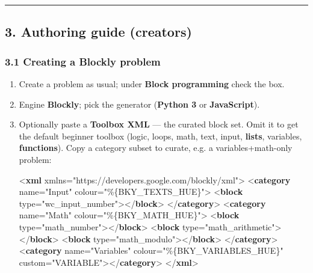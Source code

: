 \documentclass[
]{article}
\newenvironment{Shaded}{}{}
\newcommand{\KeywordTok}[1]{\textcolor[rgb]{0.00,0.44,0.13}{\textbf{#1}}}
\newcommand{\NormalTok}[1]{#1}
\newcommand{\OtherTok}[1]{\textcolor[rgb]{0.00,0.44,0.13}{#1}}
\newcommand{\StringTok}[1]{\textcolor[rgb]{0.25,0.44,0.63}{#1}}
\begin{document}
\begin{center}\rule{0.5\linewidth}{0.5pt}\end{center}

\subsection{3. Authoring guide
(creators)}\label{3-authoring-guide-creators}

\subsubsection{3.1 Creating a Blockly
problem}\label{31-creating-a-blockly-problem}

\begin{enumerate}
\def\labelenumi{\arabic{enumi}.}
\item
  Create a problem as usual; under \textbf{Block programming} check the
  box.
\item
  Engine \textbf{Blockly}; pick the generator (\textbf{Python 3} or
  \textbf{JavaScript}).
\item
  Optionally paste a \textbf{Toolbox XML} --- the curated block set.
  Omit it to get the default beginner toolbox (logic, loops, math, text,
  input, \textbf{lists}, variables, \textbf{functions}). Copy a category
  subset to curate, e.g. a variables+math-only problem:

\begin{Shaded}
\begin{Highlighting}[]
\NormalTok{\textless{}}\KeywordTok{xml} \OtherTok{xmlns=}\StringTok{"https://developers.google.com/blockly/xml"}\NormalTok{\textgreater{}}
\NormalTok{  \textless{}}\KeywordTok{category} \OtherTok{name=}\StringTok{"Input"} \OtherTok{colour=}\StringTok{"\%\{BKY\_TEXTS\_HUE\}"}\NormalTok{\textgreater{}}
\NormalTok{    \textless{}}\KeywordTok{block} \OtherTok{type=}\StringTok{"wc\_input\_number"}\NormalTok{\textgreater{}\textless{}/}\KeywordTok{block}\NormalTok{\textgreater{}}
\NormalTok{  \textless{}/}\KeywordTok{category}\NormalTok{\textgreater{}}
\NormalTok{  \textless{}}\KeywordTok{category} \OtherTok{name=}\StringTok{"Math"} \OtherTok{colour=}\StringTok{"\%\{BKY\_MATH\_HUE\}"}\NormalTok{\textgreater{}}
\NormalTok{    \textless{}}\KeywordTok{block} \OtherTok{type=}\StringTok{"math\_number"}\NormalTok{\textgreater{}\textless{}/}\KeywordTok{block}\NormalTok{\textgreater{}}
\NormalTok{    \textless{}}\KeywordTok{block} \OtherTok{type=}\StringTok{"math\_arithmetic"}\NormalTok{\textgreater{}\textless{}/}\KeywordTok{block}\NormalTok{\textgreater{}}
\NormalTok{    \textless{}}\KeywordTok{block} \OtherTok{type=}\StringTok{"math\_modulo"}\NormalTok{\textgreater{}\textless{}/}\KeywordTok{block}\NormalTok{\textgreater{}}
\NormalTok{  \textless{}/}\KeywordTok{category}\NormalTok{\textgreater{}}
\NormalTok{  \textless{}}\KeywordTok{category} \OtherTok{name=}\StringTok{"Variables"} \OtherTok{colour=}\StringTok{"\%\{BKY\_VARIABLES\_HUE\}"} \OtherTok{custom=}\StringTok{"VARIABLE"}\NormalTok{\textgreater{}\textless{}/}\KeywordTok{category}\NormalTok{\textgreater{}}
\NormalTok{\textless{}/}\KeywordTok{xml}\NormalTok{\textgreater{}}
\end{Highlighting}
\end{Shaded}


\end{enumerate}
\end{document}

